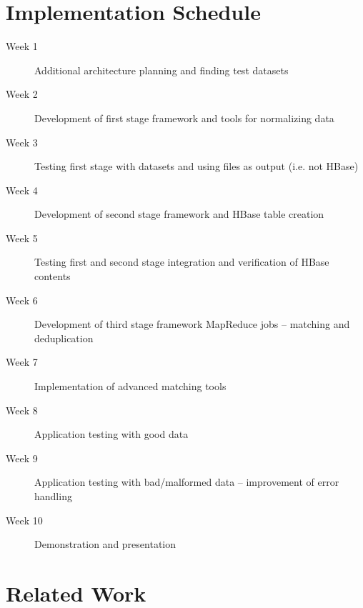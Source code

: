 \documentclass[12pt]{article}
\begin{document}
\section{Implementation Schedule}
\begin{description}
    \item[Week 1] Additional architecture planning and finding test datasets
    \item[Week 2] Development of first stage framework and tools for normalizing data
    \item[Week 3] Testing first stage with datasets and using files as output (i.e. not HBase)
    \item[Week 4] Development of second stage framework and HBase table creation
    \item[Week 5] Testing first and second stage integration and verification of HBase contents
    \item[Week 6] Development of third stage framework MapReduce jobs -- matching and deduplication
    \item[Week 7] Implementation of advanced matching tools
    \item[Week 8] Application testing with good data
    \item[Week 9] Application testing with bad/malformed data -- improvement of error handling
    \item[Week 10] Demonstration and presentation
\end{description}
\section{Related Work}
\end{document}
